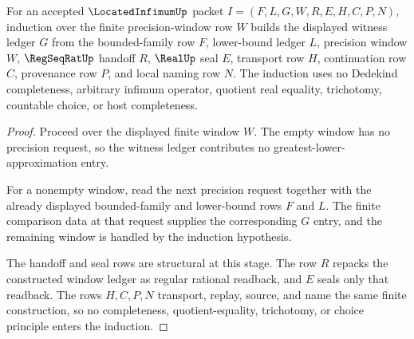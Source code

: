 \begin{theorem}
\label{thm:located-infimum-window-induction}
For an accepted $\LocatedInfimumUp$ packet $I=(F,L,G,W,R,E,H,C,P,N)$, induction over the finite precision-window row $W$ builds the displayed witness ledger $G$ from the bounded-family row $F$, lower-bound ledger $L$, precision window $W$, $\RegSeqRatUp$ handoff $R$, $\RealUp$ seal $E$, transport row $H$, continuation row $C$, provenance row $P$, and local naming row $N$. The induction uses no Dedekind completeness, arbitrary infimum operator, quotient real equality, trichotomy, countable choice, or host completeness.
\end{theorem}
\begin{proof}
Proceed over the displayed finite window $W$. The empty window has no precision request, so the witness ledger contributes no greatest-lower-approximation entry.

For a nonempty window, read the next precision request together with the already displayed bounded-family and lower-bound rows $F$ and $L$. The finite comparison data at that request supplies the corresponding $G$ entry, and the remaining window is handled by the induction hypothesis.

The handoff and seal rows are structural at this stage. The row $R$ repacks the constructed window ledger as regular rational readback, and $E$ seals only that readback. The rows $H,C,P,N$ transport, replay, source, and name the same finite construction, so no completeness, quotient-equality, trichotomy, or choice principle enters the induction.
\end{proof}

